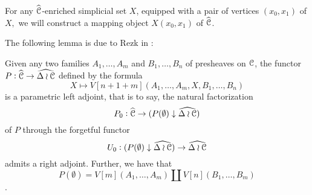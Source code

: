 For any \(\widehat{\mathcal{C}}\)-enriched simplicial set \(X\), equipped with a pair of vertices \((x_0,x_1)\) of \(X,\) we will construct a mapping object \(X(x_0,x_1)\) of \(\widehat{\mathcal{C}}\).

The following lemma is due to Rezk in \cite{rezk-theta-n-spaces}:
\begin{lemma}\label{leftadjointness}
Given any two families \(A_1,\dots, A_m\) and \(B_1,\dots, B_n\) of presheaves on \(\mathcal{C}\), the functor \(P:\widehat{\mathcal{C}}\to \widehat{\Delta\wr \mathcal{C}}\) defined by the formula \[X\mapsto V[n+1+m](A_1,\dots,A_m,X,B_1,\dots,B_n)\] is a parametric left adjoint, that is to say, the natural factorization \[P_0:\widehat{\mathcal{C}}\to {(P(\emptyset)\downarrow \widehat{\Delta\wr \ensuremath{\mathcal{C}}})}\] of \(P\) through the forgetful functor \[U_0: {(P(\emptyset)\downarrow \widehat{\Delta\wr \mathcal{C}})}\to \widehat{\Delta\wr \mathcal{C}}\] admits a right adjoint. Further, we have that \[P(\emptyset)=V[m](A_1,\dots,A_m)\coprod V[n](B_1,\dots,B_m)\].   
\end{lemma}
